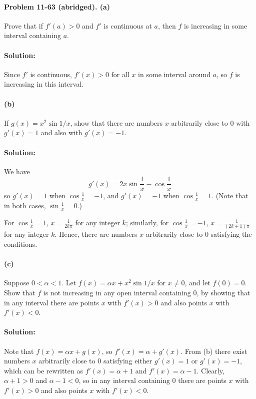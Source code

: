 \documentclass{article}
\begin{document}
\paragraph{Problem 11-63 (abridged). (a)} Prove that if $f'(a) > 0$ and $f'$ is
continuous at $a$, then $f$ is increasing in some interval containing $a$.

\paragraph{Solution:} Since $f'$ is continuous, $f'(x) > 0$ for all $x$ in some
interval around $a$, so $f$ is increasing in this interval.

\paragraph{(b)} If $g(x) = x^2\sin{1/x}$, show that there are numbers $x$
arbitrarily close to 0 with $g'(x) = 1$ and also with $g'(x) = -1$.
\paragraph{Solution:} We have \begin{equation*}
  g'(x) = 2x\sin{\frac{1}{x}} - \cos{\frac{1}{x}}
\end{equation*} so $g'(x) = 1$ when $\cos{\frac{1}{x}} = -1$, and $g'(x) = -1$
when $\cos{\frac{1}{x}} = 1$. (Note that in both cases, $\sin{\frac{1}{x}} =
0$.)

For $\cos{\frac{1}{x}} = 1$, $x = \frac{1}{2k\pi}$ for any integer $k$;
similarly, for $\cos{\frac{1}{x}} = -1$, $x = \frac{1}{(2k + 1)\pi}$ for any
integer $k$. Hence, there are numbers $x$ arbitrarily close to 0 satisfying the
conditions.

\paragraph{(c)} Suppose $0 < \alpha < 1$. Let $f(x) = \alpha x + x^2\sin{1/x}$
for $x \neq 0$, and let $f(0) = 0$. Show that $f$ is not increasing in any open
interval containing 0, by showing that in any interval there are points $x$
with $f'(x) > 0$ and also points $x$ with $f'(x) < 0$.

\paragraph{Solution:} Note that $f(x) = \alpha x + g(x)$, so $f'(x) = \alpha +
g'(x)$. From (b) there exist numbers $x$ arbitrarily close to 0 satisfying
either $g'(x) = 1$ or $g'(x) = -1$, which can be rewritten as $f'(x) = \alpha +
1$ and $f'(x) = \alpha - 1$. Clearly, $\alpha + 1 > 0$ and $\alpha - 1 < 0$, so
in any interval containing 0 there are points $x$ with $f'(x) > 0$ and also
points $x$ with $f'(x) < 0$.
\end{document}
